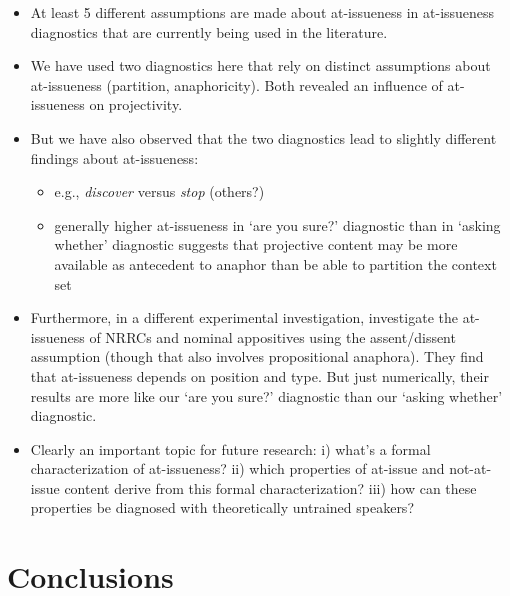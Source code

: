 \documentclass[11pt,fleqn]{article}
\newcommand{\6}{\mbox{$[\hspace*{-.6mm}[$}}
\newcommand{\9}{\mbox{$]\hspace*{-.6mm}]$}}
\begin{document}
\begin{itemize}

\item At least 5 different assumptions are made about at-issueness in at-issueness diagnostics that are currently being used in the literature.

\item We have used two diagnostics here that rely on distinct assumptions about at-issueness (partition, anaphoricity). Both revealed an influence of at-issueness on projectivity.

\item But we have also observed that the two diagnostics lead to slightly different findings about at-issueness:

\begin{itemize}

\item e.g., {\em discover} versus {\em stop} (others?)

\item generally higher at-issueness in `are you sure?' diagnostic than in `asking whether' diagnostic suggests that projective content may be more available as antecedent to anaphor than be able to partition the context set

\end{itemize}

\item Furthermore, in a different experimental investigation, \citealt{syrett-koev2015} investigate the at-issueness of NRRCs and nominal appositives using the assent/dissent assumption (though that also involves propositional anaphora). They find that at-issueness depends on position and type. But just numerically, their results are more like our `are you sure?' diagnostic than our `asking whether' diagnostic.

\item Clearly an important topic for future research: i) what's a formal characterization of at-issueness? ii) which properties of at-issue and not-at-issue content derive from this formal characterization? iii) how can these properties be diagnosed with theoretically untrained speakers? 

\end{itemize}


\section{Conclusions}\label{s6}
\end{document}
